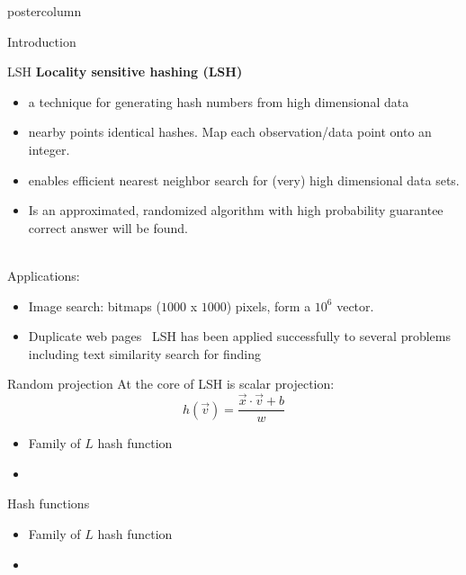 \documentclass[final,hyperref={pdfpagelabels=false}]{beamer}
\begin{document}
\begin{frame}[fragile]
\begin{columns}
\begin{column}{.49\textwidth}
\begin{beamercolorbox}[center,wd=\textwidth]{postercolumn}
\begin{minipage}[T]{.95\textwidth}
{\begin{block}{Introduction}
            \end{block}
            \vfill
            \begin{block}{LSH}
{\bf Locality sensitive hashing (LSH)~\citep{datar2004}}
\begin{itemize} 
\item a technique for generating hash numbers
from high dimensional data
\item nearby points identical hashes. Map each observation/data point onto an integer.
\item enables efficient nearest neighbor search for (very) high dimensional data sets.
\item Is an approximated, randomized algorithm with high probability guarantee correct answer will be found. 
\end{itemize}~\\
  Applications:
  \begin{itemize}
    \item Image search: bitmaps ($1000$ x $1000$) pixels, form a $10^6$ vector.
    \item Duplicate web pages~\citep{slaney2008}
    LSH has been applied successfully to several problems including text similarity search for finding 
  \end{itemize}
            \end{block}
            \vfill
            \begin{block}{Random projection}
            At the core of LSH is scalar projection:
            $$
            h (\vec{v})=  \frac{\vec{x} \cdot \vec{v} + b}{w}
            $$
              \begin{itemize}
              	\item Family of $L$ hash function
              	\item
              \end{itemize}
            \end{block}
            \vfill
            \begin{block}{Hash functions}
              \begin{itemize}
              	\item Family of $L$ hash function
              	\item
              \end{itemize}
            \end{block}
          }
        \end{minipage}
      \end{beamercolorbox}
    \end{column}


\end{columns}
\end{frame}
\end{document}
